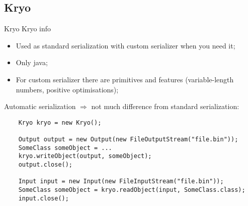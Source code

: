 \documentclass[8pt]{beamer}
\begin{document}
\renewcommand{\partname}{Kryo}
\subsection{\partname}
\begin{frame}[fragile]{\partname}
  Kryo info
\begin{itemize}
  \item Used as standard serialization with custom serializer when you
  need it;
  \item Only java;
  \item For custom serializer there are primitives and features
  (variable-length numbers, positive optimisations);
\end{itemize}

Automatic serialization $\Rightarrow$ not much difference from
standard serialization:

  \begin{verbatim}
    Kryo kryo = new Kryo();

    Output output = new Output(new FileOutputStream("file.bin"));
    SomeClass someObject = ...
    kryo.writeObject(output, someObject);
    output.close();

    Input input = new Input(new FileInputStream("file.bin"));
    SomeClass someObject = kryo.readObject(input, SomeClass.class);
    input.close();
  \end{verbatim}

\end{frame}

\renewcommand{\partname}{Kryo custom}
\end{document}

